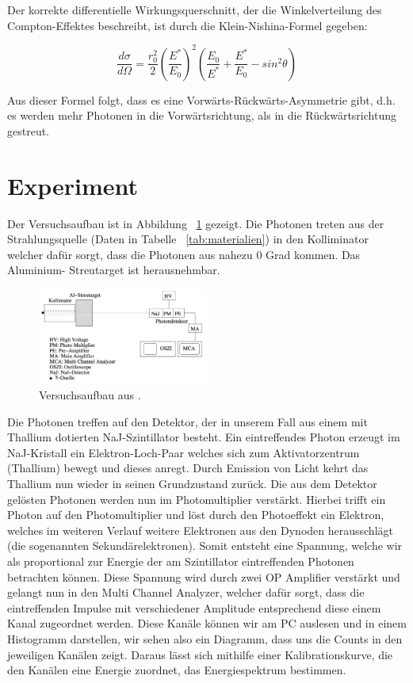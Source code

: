 \documentclass[aps,twocolumn,secnumarabic,nobalancelastpage,amsmath,amssymb,
nofootinbib,superscriptaddress]{revtex4-1}
\begin{document}
Der korrekte differentielle Wirkungsquerschnitt, der die Winkelverteilung des
Compton-Effektes beschreibt, ist durch die Klein-Nishina-Formel gegeben:

  \begin{equation}
    \frac{d \sigma}{d \Omega} = \frac{r_0^2}{2} \left( \frac{E^*}{E_0} \right)^2
    \left( \frac{E_0}{E^*} + \frac{E^*}{E_0} - sin^2 \theta    \right)
    \label{eq:kleinnishina}
  \end{equation}

Aus dieser Formel folgt, dass es eine Vorwärts-Rückwärts-Asymmetrie gibt, d.h.
es werden mehr Photonen in die Vorwärtsrichtung, als in die Rückwärtsrichtung
gestreut.


\section{Experiment}
Der Versuchsaufbau ist in Abbildung ~\ref{fig:aufbau} gezeigt. Die Photonen treten
aus der Strahlungsquelle (Daten in Tabelle ~\ref{tab:materialien}) in den Kolliminator
welcher dafür sorgt, dass die Photonen aus nahezu 0 Grad kommen. Das Aluminium-
Streutarget ist herausnehmbar.

\begin{figure}[h]
  \centering
  \includegraphics[width=0.5\textwidth]{aufbau.jpeg}
  \caption{\label{fig:aufbau} Versuchsaufbau aus \cite{skript07}.}
\end{figure}

Die Photonen treffen auf den Detektor, der in unserem
Fall aus einem mit Thallium dotierten NaJ-Szintillator besteht. Ein eintreffendes Photon
erzeugt im NaJ-Kristall ein Elektron-Loch-Paar welches sich zum Aktivatorzentrum
(Thallium) bewegt und dieses anregt. Durch Emission von Licht kehrt das Thallium
nun wieder in seinen Grundzustand zurück. Die aus dem Detektor gelösten Photonen
werden nun im Photomultiplier verstärkt. Hierbei trifft ein Photon auf den
Photomultiplier und löst durch den Photoeffekt ein Elektron, welches im weiteren
Verlauf weitere Elektronen aus den Dynoden herausschlägt (die sogenannten
Sekundärelektronen). Somit entsteht eine Spannung, welche wir als proportional zur
Energie der am Szintillator eintreffenden Photonen betrachten können. Diese
Spannung wird durch zwei OP Amplifier verstärkt und gelangt nun in den Multi Channel
Analyzer, welcher dafür sorgt, dass die eintreffenden Impulse mit verschiedener
Amplitude entsprechend diese einem Kanal zugeordnet werden. Diese Kanäle können
wir am PC auslesen und in einem Histogramm darstellen, wir sehen also ein Diagramm,
dass uns die Counts in den jeweiligen Kanälen zeigt. Daraus lässt sich mithilfe einer Kalibrationskurve,
die den Kanälen eine Energie zuordnet, das Energiespektrum bestimmen.
\end{document}
